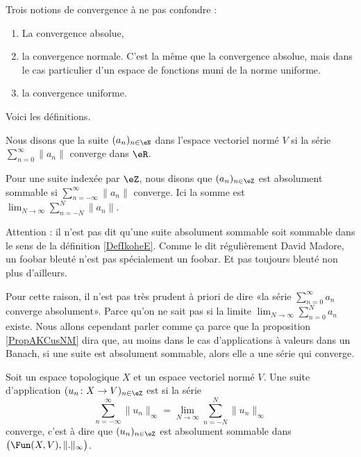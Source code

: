 Trois notions de convergence à ne pas confondre :
\begin{enumerate}
	\item
	      La convergence absolue,
	\item
	      la convergence normale. C'est la même que la convergence absolue, mais dans le cas particulier d'un espace de fonctions muni de la norme uniforme.
	\item
	      la convergence uniforme.
\end{enumerate}
Voici les définitions.

\begin{definition} \label{DefVFUIXwU}
	Nous disons que la suite \( (a_n)_{n\in \eN}\) dans l'espace vectoriel normé \( V\)  si la série \( \sum_{n=0}^{\infty}\| a_n \|\) converge dans \( \eR\).

	Pour une suite indexée par \( \eZ\), nous disons que \( (a_n)_{n\in \eZ}\) est absolument sommable si \( \sum_{n=-\infty}^{\infty}\| a_n \|\) converge. Ici la somme est \( \lim_{N\to \infty}\sum_{n=-N}^N\| a_n \|\).
\end{definition}

Attention : il n'est pas dit qu'une suite absolument sommable soit sommable dans le sens de la définition \ref{DefIkoheE}. Comme le dit régulièrement David Madore, un foobar bleuté n'est pas spécialement un foobar. Et pas toujours bleuté non plus d'ailleurs.

Pour cette raison, il n'est pas très prudent à priori de dire «la série \( \sum_{n=0}^{\infty}a_n\) converge absolument». Parce qu'on ne sait pas si la limite \( \lim_{N\to \infty}\sum_{n=0}^Na_n\) existe. Nous allons cependant parler comme ça parce que la proposition \ref{PropAKCusNM} dira que, au moins dans le cas d'applications à valeurs dans un Banach, si une suite est absolument sommable, alors elle a une série qui converge.

\begin{definition} \label{DefVBrJUxo}
	Soit un espace topologique \( X\) et un espace vectoriel normé \( V\). Une suite d'application \( (u_n \colon X\to V)_{n\in \eZ}  \) est  si la série
	\begin{equation}
		\sum_{n=-\infty}^{\infty}\| u_n \|_{\infty}=\lim_{N\to \infty}\sum_{n=-N}^N\| u_n \|_{\infty}
	\end{equation}
	converge, c'est à dire que \( (u_n)_{n\in \eZ}\) est absolument sommable dans \( \big( \Fun(X,V), \| . \|_{\infty} \big)\).
\end{definition}

